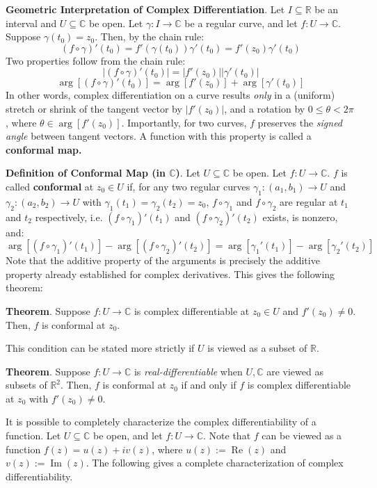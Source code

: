 \begin{shaded}
    \textbf{Geometric Interpretation of Complex Differentiation}. Let $I\subseteq\mathbb{R}$ be an interval and $U\subseteq\mathbb{C}$ be open. Let $\gamma:I\to \mathbb{C}$ be a regular curve, and let $f:U\to\mathbb{C}$. Suppose $\gamma(t_0)=z_0$. Then, by the chain rule: \[(f\circ\gamma)'(t_0) = f'(\gamma(t_0))\gamma'(t_0) = f'(z_0) \gamma'(t_0)\] Two properties follow from the chain rule: \[|(f\circ \gamma)'(t_0)| = |f'(z_0)| |\gamma'(t_0)|\tag{Stretching Property}\] \[\arg[(f\circ \gamma)'(t_0)] = \arg[f'(z_0)] + \arg[\gamma'(t_0)]\tag{Rotation Property}\] In other words, complex differentiation on a curve results \textit{only} in a (uniform) stretch or shrink of the tangent vector by $|f'(z_0)|$, and a rotation by $0\leq \theta < 2\pi$, where $\theta\in \arg[f'(z_0)]$. Importantly, for two curves, $f$ preserves the \textit{signed angle} between tangent vectors. A function with this property is called a \textbf{conformal map.}

    \textbf{Definition of Conformal Map (in $\mathbb{C}$)}. Let $U\subseteq \mathbb{C}$ be open. Let $f:U\to \mathbb{C}$. $f$ is called \textbf{conformal} at $z_0\in U$ if, for any two regular curves $\gamma_1:(a_1,b_1)\to U$ and $\gamma_2:(a_2,b_2)\to U$ with $\gamma_1(t_1)=\gamma_2(t_2)=z_0$, $f\circ \gamma_1$ and $f\circ \gamma_2$ are regular at $t_1$ and $t_2$ respectively, i.e. $(f\circ \gamma_1)'(t_1)$ and $(f\circ \gamma_2)'(t_2)$ exists, is nonzero, and: \[\arg[(f\circ\gamma_1)'(t_1)] - \arg[(f\circ \gamma_2)'(t_2)] = \arg[\gamma_1'(t_1)] - \arg[\gamma_2'(t_2)]\] Note that the additive property of the arguments is precisely the additive property already established for complex derivatives. This gives the following theorem:
    
    \textbf{Theorem}. Suppose $f:U\to\mathbb{C}$ is complex differentiable at $z_0\in U$ and $f'(z_0)\neq 0$. Then, $f$ is conformal at $z_0$.

    This condition can be stated more strictly if $U$ is viewed as a subset of $\mathbb{R}$.

    \textbf{Theorem}. Suppose $f:U\to\mathbb{C}$ is \textit{real-differentiable} when $U,\mathbb{C}$ are viewed as subsets of $\mathbb{R}^2$. Then, $f$ is conformal at $z_0$ if and only if $f$ is complex differentiable at $z_0$ with $f'(z_0)\neq 0$.
\end{shaded}

It is possible to completely characterize the complex differentiability of a function. Let $U\subseteq \mathbb{C}$ be open, and let $f:U\to\mathbb{C}$. Note that $f$ can be viewed as a function $f(z) = u(z)+iv(z)$, where $u(z):=\operatorname{Re}(z)$ and $v(z):=\operatorname{Im}(z)$. The following gives a complete characterization of complex differentiability.

